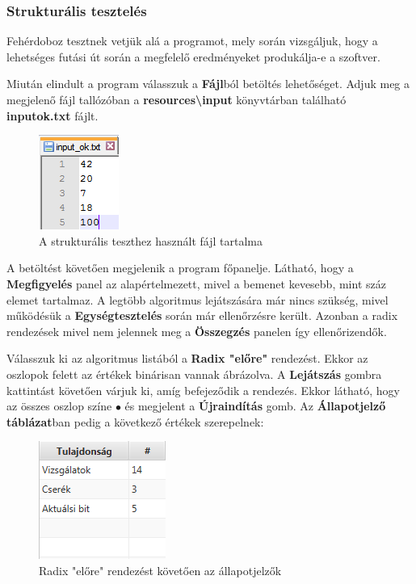 \documentclass{elteikthesis}
\begin{document}
\subsubsection{Strukturális tesztelés}
Fehérdoboz tesztnek vetjük alá a programot, mely során vizsgáljuk, hogy a lehetséges futási út során a megfelelő eredményeket produkálja-e a szoftver.\par
Miután elindult a program válasszuk a \textbf{Fájl}ból betöltés lehetőséget. Adjuk meg a megjelenő fájl tallózóban a \textbf{resources\textbackslash input} könyvtárban található \textbf{input\textunderscore ok.txt} fájlt.
\begin{figure}[H]
	\centering
	\includegraphics{pics/test/file_content.png}
	\caption{A strukturális teszthez használt fájl tartalma}
\end{figure}
A betöltést követően megjelenik a program főpanelje. Látható, hogy a \textbf{Megfigyelés} panel az alapértelmezett, mivel a bemenet kevesebb, mint száz elemet tartalmaz. A legtöbb algoritmus lejátszására már nincs szükség, mivel működésük a \textbf{Egységtesztelés} során már ellenőrzésre került. Azonban a radix rendezések mivel nem jelennek meg a \textbf{Összegzés} panelen így ellenőrizendők.\par
Válasszuk ki az algoritmus listából a \textbf{Radix "előre"} rendezést. Ekkor az oszlopok felett az értékek binárisan vannak ábrázolva. A \textbf{Lejátszás} gombra kattintást követően várjuk ki, amíg befejeződik a rendezés. Ekkor látható, hogy az összes oszlop színe \textcolor{done}{\Huge$\bullet$} és megjelent a \textbf{Újraindítás} gomb. Az \textbf{Állapotjelző táblázat}ban pedig a következő értékek szerepelnek:
\begin{figure}[H]
	\centering
	\includegraphics{pics/test/radixforwardcounters.png}
	\caption{Radix "előre" rendezést követően az állapotjelzők}
\end{figure}
\end{document}
